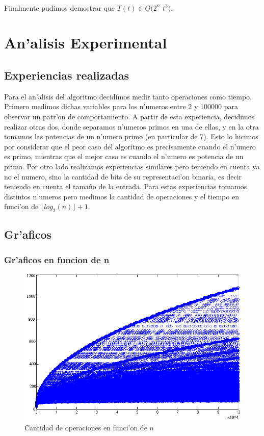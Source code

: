 \paragraph{}
Finalmente pudimos demostrar que $T(t) \in O(2^n $ $t^3)$.


\section{An'alisis Experimental}
\subsection{Experiencias realizadas}
Para el an'alisis del algoritmo decidimos medir tanto operaciones como tiempo. Primero medimos dichas variables 
para los n'umeros entre 2 y 100000 para observar un patr'on de comportamiento. A partir de esta experiencia, 
decidimos realizar otras dos, donde separamos n'umeros primos en una de ellas, y en la otra tomamos las potencias 
de un n'umero primo (en particular de 7). Esto lo hicimos por considerar que el peor caso del algoritmo es 
precisamente cuando el n'umero es primo, mientras que el mejor caso es cuando el n'umero es potencia de un primo. 
Por otro lado realizamos experiencias similares pero teniendo en cuenta ya no el numero, sino la cantidad de bits 
de su representaci'on binaria, es decir teniendo en cuenta el tama\~{n}o de la entrada. Para estas experiencias 
tomamos distintos n'umeros pero medimos la cantidad de operaciones y el tiempo en funci'on de $\lfloor log_2(n) \rfloor + 1$.

\subsection{Gr'aficos}
\subsubsection{Gr'aficos en funcion de n}

\begin{figure}[H]
\centering
\includegraphics[scale=0.7]{../../codigo/ejercicio1/benchmark/graficos/todos_los_numeros/graficosTodos.png}
\caption{Cantidad de operaciones en funci'on de $n$}
\end{figure}

